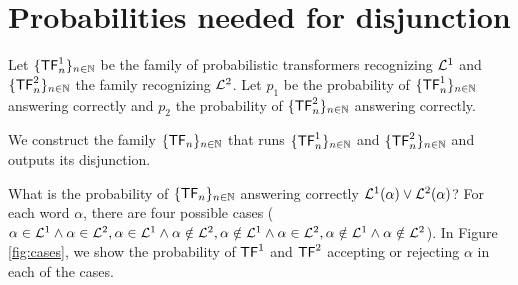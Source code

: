 \section{Probabilities needed for disjunction}\label{appendix:calculations-prob-or}

Let $\{\mathsf{TF}^1_n\}_{n \in \mathbb{N}}$ be the family of probabilistic transformers recognizing $\mathcal{L}^1$ and $\{\mathsf{TF}^2_n\}_{n \in \mathbb{N}}$ the family recognizing $\mathcal{L}^2$.
Let $p_1$ be the probability of $\{\mathsf{TF}^1_n\}_{n \in \mathbb{N}}$ answering correctly and $p_2$ the probability of $\{\mathsf{TF}^2_n\}_{n \in \mathbb{N}}$ answering correctly.

We construct the family $\{\mathsf{TF}_n\}_{n \in \mathbb{N}}$ that runs $\{\mathsf{TF}^1_n\}_{n \in \mathbb{N}}$ and $\{\mathsf{TF}^2_n\}_{n \in \mathbb{N}}$ and outputs its disjunction.

What is the probability of $\{\mathsf{TF}_n\}_{n \in \mathbb{N}}$ answering correctly $\mathcal{L}^1(\alpha) \lor \mathcal{L}^2(\alpha)$?
For each word $\alpha$, there are four possible cases
($\alpha \in    \mathcal{L}^1 \land \alpha \in    \mathcal{L}^2,
  \alpha \in    \mathcal{L}^1 \land \alpha \notin \mathcal{L}^2,
  \alpha \notin \mathcal{L}^1 \land \alpha \in    \mathcal{L}^2,
  \alpha \notin \mathcal{L}^1 \land \alpha \notin \mathcal{L}^2$).
In Figure \ref{fig:cases}, we show the probability of $\mathsf{TF}^1$ and $\mathsf{TF}^2$ accepting or rejecting $\alpha$ in each of the cases.

